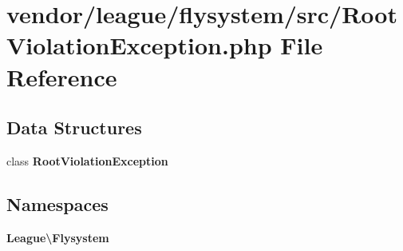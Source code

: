 \section{vendor/league/flysystem/src/\+Root\+Violation\+Exception.php File Reference}
\label{_root_violation_exception_8php}
\subsection*{Data Structures}
\begin{DoxyCompactItemize}
\item 
class {\bf Root\+Violation\+Exception}
\end{DoxyCompactItemize}
\subsection*{Namespaces}
\begin{DoxyCompactItemize}
\item 
 {\bf League\textbackslash{}\+Flysystem}
\end{DoxyCompactItemize}
